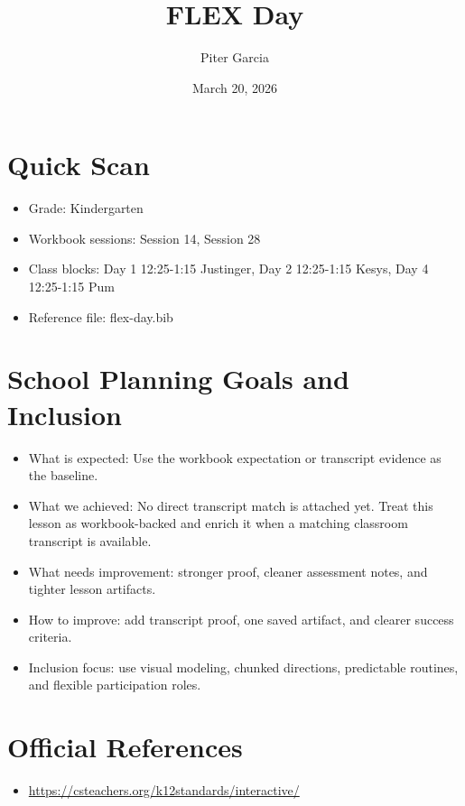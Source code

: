 \documentclass[11pt]{article}
\title{FLEX Day}
\author{Piter Garcia}
\date{March 20, 2026}
\begin{document}
\maketitle
\section*{Quick Scan}
\begin{itemize}[leftmargin=*]
\item Grade: Kindergarten
\item Workbook sessions: Session 14, Session 28
\item Class blocks: Day 1 12:25-1:15 Justinger, Day 2 12:25-1:15 Kesys, Day 4 12:25-1:15 Pum
\item Reference file: flex-day.bib
\end{itemize}
\section*{School Planning Goals and Inclusion}
\begin{itemize}[leftmargin=*]
\item What is expected: Use the workbook expectation or transcript evidence as the baseline.
\item What we achieved: No direct transcript match is attached yet. Treat this lesson as workbook-backed and enrich it when a matching classroom transcript is available.
\item What needs improvement: stronger proof, cleaner assessment notes, and tighter lesson artifacts.
\item How to improve: add transcript proof, one saved artifact, and clearer success criteria.
\item Inclusion focus: use visual modeling, chunked directions, predictable routines, and flexible participation roles.
\end{itemize}
\section*{Official References}
\begin{itemize}[leftmargin=*]
\item \url{https://csteachers.org/k12standards/interactive/}

\end{itemize}
\end{document}
